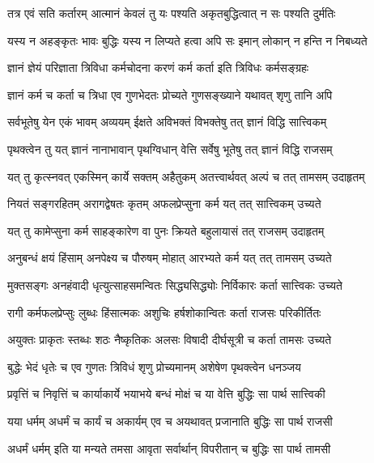 \twolineshloka
{तत्र एवं सति कर्तारम् आत्मानं केवलं तु यः}
{पश्यति अकृतबुद्धित्वात् न सः पश्यति दुर्मतिः}%

\twolineshloka
{यस्य न अहङ्कृतः भावः बुद्धिः यस्य न लिप्यते}
{हत्वा अपि सः इमान् लोकान् न हन्ति न निबध्यते}%

\twolineshloka
{ज्ञानं ज्ञेयं परिज्ञाता त्रिविधा कर्मचोदना}
{करणं कर्म कर्ता इति त्रिविधः कर्मसङ्ग्रहः}%

\twolineshloka
{ज्ञानं कर्म च कर्ता च त्रिधा एव गुणभेदतः}
{प्रोच्यते गुणसङ्ख्याने यथावत् शृणु तानि अपि}%

\twolineshloka
{सर्वभूतेषु येन एकं भावम् अव्ययम् ईक्षते}
{अविभक्तं विभक्तेषु तत् ज्ञानं विद्धि सात्त्विकम्}%

\twolineshloka
{पृथक्त्वेन तु यत् ज्ञानं नानाभावान् पृथग्विधान्}
{वेत्ति सर्वेषु भूतेषु तत् ज्ञानं विद्धि राजसम्}%

\twolineshloka
{यत् तु कृत्स्नवत् एकस्मिन् कार्ये सक्तम् अहैतुकम्}
{अतत्त्वार्थवत् अल्पं च तत् तामसम् उदाहृतम्}%

\twolineshloka
{नियतं सङ्गरहितम् अरागद्वेषतः कृतम्}
{अफलप्रेप्सुना कर्म यत् तत् सात्त्विकम् उच्यते}%

\twolineshloka
{यत् तु कामेप्सुना कर्म साहङ्कारेण वा पुनः}
{क्रियते बहुलायासं तत् राजसम् उदाहृतम्}%

\twolineshloka
{अनुबन्धं क्षयं हिंसाम् अनपेक्ष्य च पौरुषम्}
{मोहात् आरभ्यते कर्म यत् तत् तामसम् उच्यते}%

\twolineshloka
{मुक्तसङ्गः अनहंवादी धृत्युत्साहसमन्वितः}
{सिद्ध्यसिद्ध्योः निर्विकारः कर्ता सात्त्विकः उच्यते}%

\twolineshloka
{रागी कर्मफलप्रेप्सुः लुब्धः हिंसात्मकः अशुचिः}
{हर्षशोकान्वितः कर्ता राजसः परिकीर्तितः}%

\twolineshloka
{अयुक्तः प्राकृतः स्तब्धः शठः नैष्कृतिकः अलसः}
{विषादी दीर्घसूत्री च कर्ता तामसः उच्यते}%

\twolineshloka
{बुद्धेः भेदं धृतेः च एव गुणतः त्रिविधं शृणु}
{प्रोच्यमानम् अशेषेण पृथक्त्वेन धनञ्जय}%

\twolineshloka
{प्रवृत्तिं च निवृत्तिं च कार्याकार्ये भयाभये}
{बन्धं मोक्षं च या वेत्ति बुद्धिः सा पार्थ सात्त्विकी}%

\twolineshloka
{यया धर्मम् अधर्मं च कार्यं च अकार्यम् एव च}
{अयथावत् प्रजानाति बुद्धिः सा पार्थ राजसी}%

\twolineshloka
{अधर्मं धर्मम् इति या मन्यते तमसा आवृता}
{सर्वार्थान् विपरीतान् च बुद्धिः सा पार्थ तामसी}%

